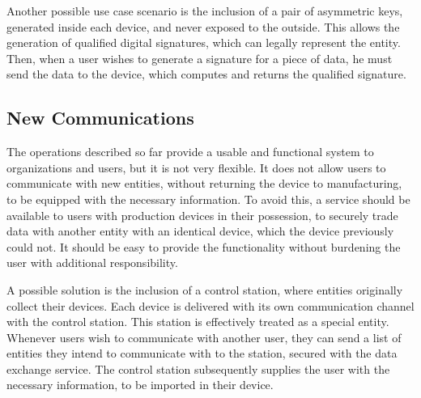 Another possible use case scenario is the inclusion of a pair of asymmetric keys, generated inside each device, and never exposed to the outside. This allows the generation of qualified digital signatures, which can legally represent the entity.
Then, when a user wishes to generate a signature for a piece of data, he must send the data to the device, which computes and returns the qualified signature.


\subsection{New Communications}\label{chap:problem:scenarios:keys}

The operations described so far provide a usable and functional system to organizations and users, but it is not very flexible. It does not allow users to communicate with new entities, without returning the device to manufacturing, to be equipped with the necessary information.
To avoid this, a service should be available to users with production devices in their possession, to securely trade data with another entity with an identical device, which the device previously could not. It should be easy to provide the functionality without burdening the user with additional responsibility.

A possible solution is the inclusion of a control station, where entities originally collect their devices. Each device is delivered with its own communication channel with the control station. This station is effectively treated as a special entity.
Whenever users wish to communicate with another user, they can send a list of entities they intend to communicate with to the station, secured with the data exchange service. The control station subsequently supplies the user with the necessary information, to be imported in their device.

